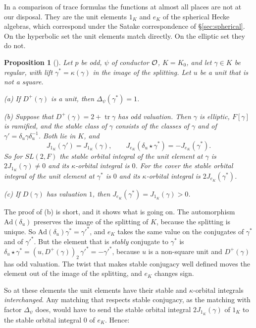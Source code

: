 \documentclass[12pt,letterpaper,openany]{book}
\theoremstyle{plain}
\newtheorem{proposition}[theorem]{Proposition}
\theoremstyle{definition}
\theoremstyle{remark}
\theoremstyle{remark}
\newcommand{\tr}{\operatorname{tr}}
\begin{document}
In a comparison of trace formulas the functions at almost all places are
not at our disposal. They are the unit elements $1_K$ and $e_K$ of the
spherical Hecke algebras, which correspond under the Satake
correspondence of \S\ref{sec:spherical}. On the hyperbolic set the unit
elements match directly. On the elliptic set they do not.

\begin{proposition}[{\cite[Proposition~8.6]{JC}}]\label{prop:unit-swap}
Let $p$ be odd, $\psi$ of conductor ${\cal O}$, $K=K_0$, and let
$\gamma\in K$ be regular, with lift $\gamma^*=\kappa(\gamma)$ in the
image of the splitting. Let $u$ be a unit that is not a square.

(a) If $D^+(\gamma)$ is a unit, then $\Delta_\psi(\gamma^*)=1$.

(b) Suppose that $D^+(\gamma)=2+\tr\gamma$ has odd valuation. Then
$\gamma$ is elliptic, $F[\gamma]$ is ramified, and the stable class of
$\gamma$ consists of the classes of $\gamma$ and of
$\gamma'=\delta_u\gamma\delta_u^{-1}$. Both lie in $K$, and
\[
J_{1_K}(\gamma')=J_{1_K}(\gamma),\qquad
J_{e_K}(\delta_u\star\gamma^*)=-J_{e_K}(\gamma^*).
\]
So for $SL(2,F)$ the stable orbital integral of the unit element at
$\gamma$ is $2J_{1_K}(\gamma)\neq0$ and its $\kappa$-orbital integral is
$0$. For the cover the stable orbital integral of the unit element at
$\gamma^*$ is $0$ and its $\kappa$-orbital integral is
$2J_{e_K}(\gamma^*)$.

(c) If $D(\gamma)$ has valuation $1$, then
$J_{e_K}(\gamma^*)=J_{1_K}(\gamma)>0$.
\end{proposition}

The proof of (b) is short, and it shows what is going on. The
automorphism $\mathrm{Ad}(\delta_u)$ preserves the image of the splitting
of $K$, because the splitting is unique. So
$\mathrm{Ad}(\delta_u)\gamma^*=\gamma'^*$, and $e_K$ takes the same value
on the conjugates of $\gamma^*$ and of $\gamma'^*$. But the element that
is \emph{stably} conjugate to $\gamma^*$ is
$\delta_u\star\gamma^*=(u,D^+(\gamma))_2\,\gamma'^*=-\gamma'^*$, because $u$
is a non-square unit and $D^+(\gamma)$ has odd valuation. The twist that
makes stable conjugacy well defined moves the element out of the image
of the splitting, and $e_K$ changes sign.

So at these elements the unit elements have their stable and
$\kappa$-orbital integrals \emph{interchanged}. Any matching that
respects stable conjugacy, as the matching with factor $\Delta_\psi$
does, would have to send the stable orbital integral $2J_{1_K}(\gamma)$
of $1_K$ to the stable orbital integral $0$ of $e_K$. Hence:
\end{document}
